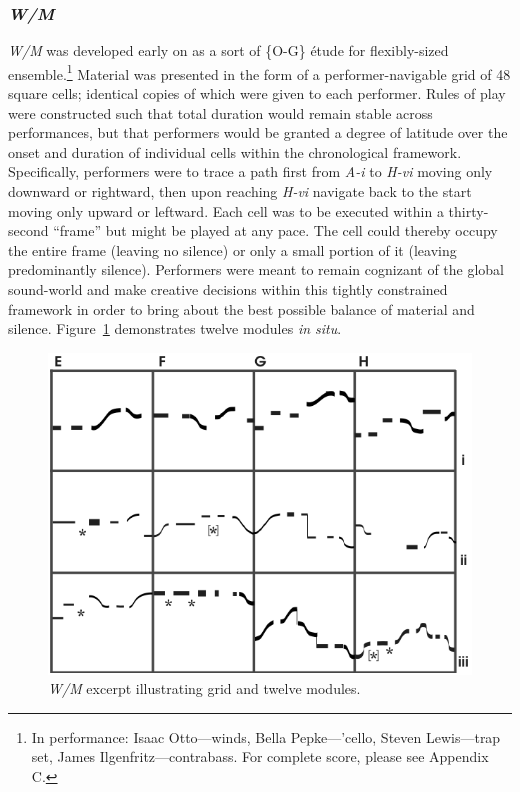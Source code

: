     \subsubsection{\textit{W/M}} 
    
    \textit{W/M} was developed early on as a sort of \{O-G\} \'{e}tude for flexibly-sized ensemble.\footnote{In performance: Isaac Otto---winds, Bella Pepke---'cello, Steven Lewis---trap set, James Ilgenfritz---contrabass. For complete score, please see Appendix C.} Material was presented in the form of a performer-navigable grid of 48 square cells; identical copies of which were given to each performer. Rules of play were constructed such that total duration would remain stable across performances, but that performers would be granted a degree of latitude over the onset and duration of individual cells within the chronological framework. Specifically, performers were to trace a path first from \textit{A-i} to \textit{H-vi} moving only downward or rightward, then upon reaching \textit{H-vi} navigate back to the start moving only upward or leftward. Each cell was to be executed within a thirty-second ``frame'' but might be played at any pace. The cell could thereby occupy the entire frame (leaving no silence) or only a small portion of it (leaving predominantly silence). Performers were meant to remain cognizant of the global sound-world and make creative decisions within this tightly constrained framework in order to bring about the best possible balance of material and silence. Figure~\ref{fig:wmselection} demonstrates twelve modules \textit{in situ}.

        \begin{figure}
            \centering
            \includegraphics[width=.6\textwidth]{images/chapter4/wmselection.png}
            \captionsetup{width=.5\textwidth}
            \caption{\textit{W/M} excerpt illustrating grid and twelve modules.}
            \label{fig:wmselection}
        \end{figure}

